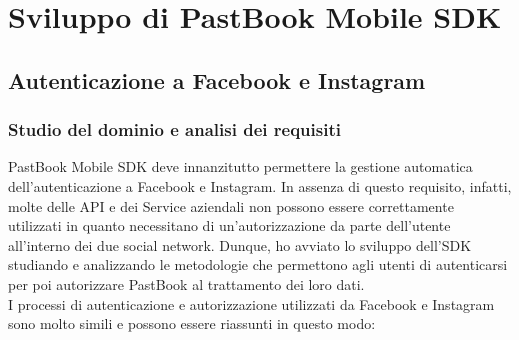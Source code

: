 	\section{Sviluppo di PastBook Mobile SDK}
		\subsection{Autenticazione a Facebook e Instagram}
			\subsubsection{Studio del dominio e analisi dei requisiti}
				PastBook Mobile SDK deve innanzitutto permettere la gestione automatica dell'autenticazione a Facebook e Instagram.
				In assenza di questo requisito, infatti, molte delle API e dei Service aziendali non possono essere correttamente
				utilizzati in quanto necessitano di un'autorizzazione da parte dell'utente all'interno dei due social network.
				Dunque, ho avviato lo sviluppo dell'SDK studiando e analizzando le metodologie che permettono agli utenti di
				autenticarsi per poi autorizzare PastBook al trattamento dei loro dati.\\
				I processi di autenticazione e autorizzazione utilizzati da Facebook e Instagram sono molto simili e possono essere
				riassunti in questo modo:
